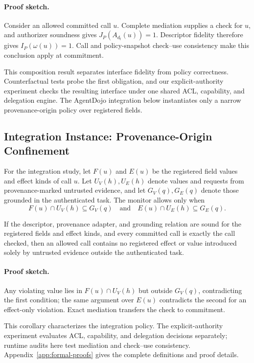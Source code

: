 \paragraph{Proof sketch.}
Consider an allowed committed call $u$.  Complete mediation supplies a check
for $u$, and authorizer soundness gives $J_P(A_{d_t}(u))=1$.  Descriptor
fidelity therefore gives $I_P(\omega(u))=1$.  Call and policy-snapshot
check--use consistency make this conclusion apply at commitment.

This composition result separates interface fidelity from policy correctness.
Counterfactual tests probe the first obligation, and our explicit-authority
experiment checks the resulting interface under one shared ACL, capability,
and delegation engine.  The AgentDojo integration below instantiates only a
narrow provenance-origin policy over registered fields.

\subsection{Integration Instance: Provenance-Origin Confinement}

For the integration study, let $F(u)$ and $E(u)$ be the registered field values
and effect kinds of call $u$.  Let $U_V(h),U_E(h)$ denote values and requests
from provenance-marked untrusted evidence, and let $G_V(q),G_E(q)$ denote those
grounded in the authenticated task.  The monitor allows only when
\[
  F(u)\cap U_V(h)\subseteq G_V(q)
  \quad\text{and}\quad
  E(u)\cap U_E(h)\subseteq G_E(q).
\]

\begin{corollary}
\label{thm:single-commit}
If the descriptor, provenance adapter, and grounding relation are sound for the
registered fields and effect kinds, and every committed call is exactly the
call checked, then an allowed call contains no registered effect or value
introduced solely by untrusted evidence outside the authenticated task.
\end{corollary}

\paragraph{Proof sketch.}
Any violating value lies in $F(u)\cap U_V(h)$ but outside $G_V(q)$, contradicting
the first condition; the same argument over $E(u)$ contradicts the second for
an effect-only violation.  Exact mediation transfers the check to commitment.

This corollary characterizes the integration policy.  The explicit-authority
experiment evaluates ACL, capability, and delegation decisions separately;
runtime audits here test mediation and check--use consistency.
Appendix~\ref{app:formal-proofs} gives the complete definitions and proof
details.
